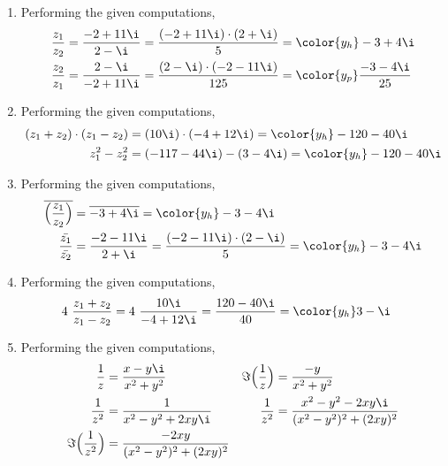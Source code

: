 \begin{enumerate}
    \item Performing the given computations,
          \begin{align}
              \frac{z_1}{z_2} & = \frac{-2 + 11\i}{2 - \i}
              = \frac{(-2 + 11\i) \cdot (2 + \i)}{5} = \color{y_h} -3 + 4\i \\
              \frac{z_2}{z_1} & = \frac{2 - \i}{-2 + 11\i}
              = \frac{(2 - \i) \cdot (-2 - 11\i)}{125}
              = \color{y_p} \frac{-3 - 4\i}{25}
          \end{align}

    \item Performing the given computations,
          \begin{align}
              (z_1 + z_2) \cdot (z_1 - z_2) & = (10\i) \cdot (-4 + 12\i)
              = \color{y_h} -120 - 40\i                                   \\
              z_1^2 - z_2^2                 & = (-117 - 44\i) - (3 - 4\i)
              = \color{y_h} -120 - 40\i
          \end{align}

    \item Performing the given computations,
          \begin{align}
              \overline{\Big(\frac{z_1}{z_2}\Big)} & = \overline{-3 + 4\i}
              = \color{y_h} -3 - 4\i                                            \\
              \frac{\bar{z_1}}{\bar{z_2}}          & = \frac{-2 - 11\i}{2 + \i}
              = \frac{(-2 - 11\i) \cdot (2 - \i)}{5}
              = \color{y_h} -3 - 4\i
          \end{align}

    \item Performing the given computations,
          \begin{align}
              4\ \frac{z_1 + z_2}{z_1 - z_2} & = 4\ \frac{10\i}{-4 + 12\i}
              = \frac{120 -40\i}{40} = \color{y_h} 3 - \i
          \end{align}

    \item Performing the given computations,
          \begin{align}
              \frac{1}{z}                     & = \frac{x - y\i}{x^2 + y^2}    &
              \Im{\Big( \frac{1}{z} \Big)}    & = \frac{-y}{x^2 + y^2}           \\
              \frac{1}{z^2}                   & = \frac{1}{x^2 - y^2 + 2xy \i} &
              \frac{1}{z^2}                   & = \frac{x^2 - y^2 - 2xy\i}
              {(x^2 - y^2)^2 + (2xy)^2}                                          \\
              \Im{ \Big( \frac{1}{z^2} \Big)} & = \frac{-2xy}{(x^2 - y^2)^2
                  + (2xy)^2}
          \end{align}


\end{enumerate}
